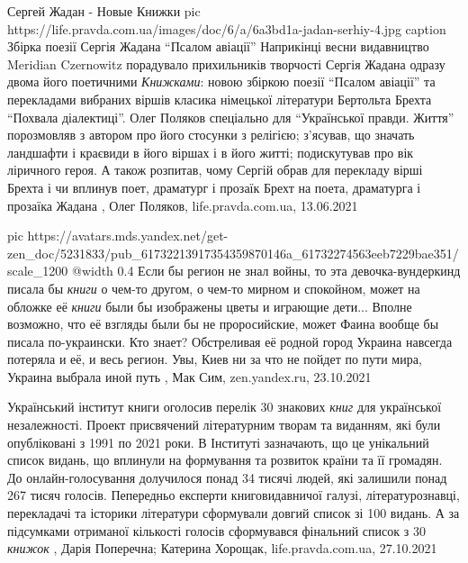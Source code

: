 Сергей Жадан - Новые Книжки
\ifcmt
  pic https://life.pravda.com.ua/images/doc/6/a/6a3bd1a-jadan-serhiy-4.jpg
	caption Збірка поезії Сергія Жадана \enquote{Псалом авіації}
\fi
Наприкінці весни видавництво Meridian Czernowitz порадувало прихильників
творчості Сергія Жадана одразу двома його поетичними \emph{Книжками}: новою збіркою
поезії \enquote{Псалом авіації} та перекладами вибраних віршів класика німецької
літератури Бертольта Брехта \enquote{Похвала діалектиці}.  Олег Поляков спеціально для
\enquote{Української правди. Життя} порозмовляв з автором про його стосунки з релігією;
з'ясував, що значать ландшафти і краєвиди в його віршах і в його житті;
подискутував про вік ліричного героя. А також розпитав, чому Сергій обрав для
перекладу вірші Брехта і чи вплинув поет, драматург і прозаїк Брехт на поета,
драматурга і прозаїка Жадана
, 
Олег Поляков, life.pravda.com.ua, 13.06.2021

\ifcmt
  pic https://avatars.mds.yandex.net/get-zen_doc/5231833/pub_61732213917354359870146a_61732274563eeb7229bae351/scale_1200
  @width 0.4
\fi
Если бы регион не знал войны, то эта девочка-вундеркинд писала бы \emph{книги}
о чем-то другом, о чем-то мирном и спокойном, может на обложке её \emph{книги}
были бы изображены цветы и играющие дети...  Вполне возможно, что её взгляды
были бы не проросийские, может Фаина вообще бы писала по-украински. Кто знает?
Обстреливая её родной город Украина навсегда потеряла и её, и весь регион.
Увы, Киев ни за что не пойдет по пути мира, Украина выбрала иной путь
, Мак Сим, zen.yandex.ru, 23.10.2021

Український інститут книги оголосив перелік 30 знакових \emph{книг} для української
незалежності.  Проект присвячений літературним творам та виданням, які були
опубліковані з 1991 по 2021 роки.  В Інституті зазначають, що це унікальний
список видань, що вплинули на формування та розвиток країни та її громадян.  До
онлайн-голосування долучилося понад 34 тисячі людей, які залишили понад 267
тисяч голосів.  Пепередньо експерти книговидавничої галузі, літературознавці,
перекладачі та історики літератури сформували довгий список зі 100 видань.  А
за підсумками отриманої кількості голосів сформувався фінальний список з 30
\emph{книжок}
, 
Дарія Поперечна; Катерина Хорощак, life.pravda.com.ua, 27.10.2021

